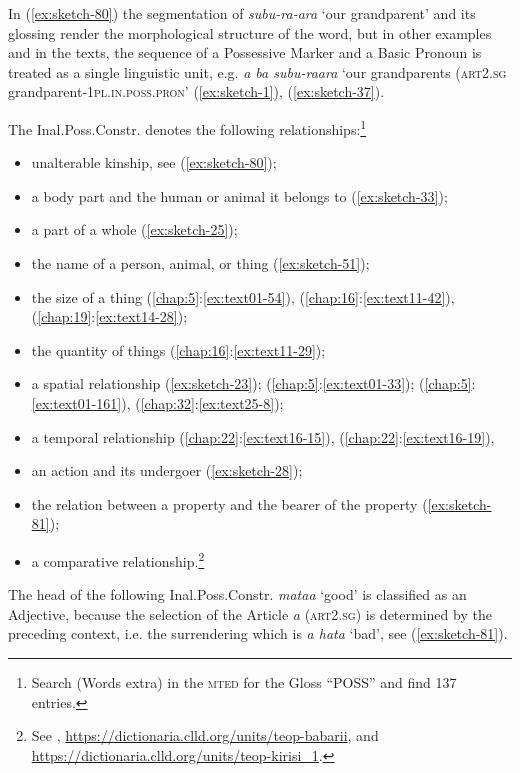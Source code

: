 \documentclass[output=paper]{langscibook}
\begin{document}
In (\ref{ex:sketch-80}) the segmentation of \textit{subu-ra-ara} `our grandparent' and its glossing render the morphological structure of the word, but in other examples and in the texts, the sequence of a Possessive Marker and a Basic Pronoun is treated as a single linguistic unit, e.g. \textit{a ba subu-raara} `our grandparents (\textsc{art}2.\textsc{sg} grandparent-1\textsc{pl}.\textsc{in}.\textsc{poss}.\textsc{pron}' (\ref{ex:sketch-1}), (\ref{ex:sketch-37}).

The Inal.Poss.Constr. denotes the following relationships:\footnote{Search (Words extra) in the \textsc{mted} for the Gloss ``POSS'' and find 137 entries.}

\begin{itemize}
    \item unalterable kinship, see (\ref{ex:sketch-80});
    \item a body part and the human or animal it belongs to (\ref{ex:sketch-33});
    \item a part of a whole (\ref{ex:sketch-25}); 
    \item the name of a person, animal, or thing (\ref{ex:sketch-51});
    \item the size of a thing (\ref{chap:5}:\ref{ex:text01-54}), (\ref{chap:16}:\ref{ex:text11-42}), (\ref{chap:19}:\ref{ex:text14-28});
    \item the quantity of things (\ref{chap:16}:\ref{ex:text11-29});
    \item a spatial relationship (\ref{ex:sketch-23}); (\ref{chap:5}:\ref{ex:text01-33}); (\ref{chap:5}:\ref{ex:text01-161}), (\ref{chap:32}:\ref{ex:text25-8});
    \item a temporal relationship (\ref{chap:22}:\ref{ex:text16-15}), (\ref{chap:22}:\ref{ex:text16-19}), 
    \item an action and its undergoer (\ref{ex:sketch-28});
    \item the relation between a property and the bearer of the property (\ref{ex:sketch-81});
    \item a comparative relationship.\footnote{See \textcite[279--280]{Mosel:2017as}, \url{https://dictionaria.clld.org/units/teop-babarii}, and \url{https://dictionaria.clld.org/units/teop-kirisi\_1}.}
\end{itemize}

The head of the following Inal.Poss.Constr. \textit{mataa} `good' is classified as an Adjective, because the selection of the Article \textit{a} (\textsc{art}2.\textsc{sg}) is determined by the preceding context, i.e. the surrendering which is \textit{a hata} `bad',  see (\ref{ex:sketch-81}).
\end{document}
